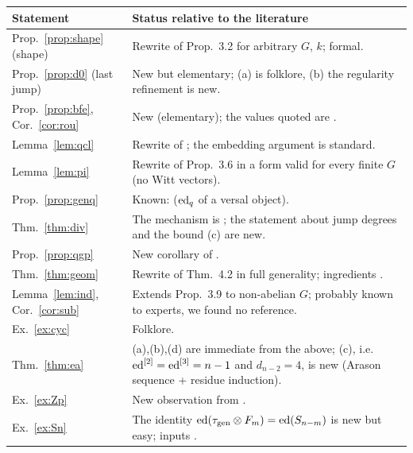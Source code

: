 \begin{center}
\small
\begin{tabular}{@{}p{}p{}@{}}
\toprule
Statement & Status relative to the literature\\
\midrule
Prop.~\ref{prop:shape} (shape) & Rewrite of Prop.~3.2 for arbitrary $G$, $k$; formal.\\
Prop.~\ref{prop:d0} (last jump) & New but elementary; (a) is folklore, (b) the
regularity refinement is new.\\
Prop.~\ref{prop:bfe}, Cor.~\ref{cor:rou} & New (elementary); the values quoted are
\cite{BR,KM}.\\
Lemma~\ref{lem:qcl} & Rewrite of \cite[(2.5)]{RS}; the embedding argument is standard.\\
Lemma~\ref{lem:pi} & Rewrite of Prop.~3.6 in a form valid for every finite $G$
(no Witt vectors).\\
Prop.~\ref{prop:genq} & Known: \cite{RS,Me} ($\operatorname{ed}_q$ of a versal object).\\
Thm.~\ref{thm:div} & The mechanism is \cite[Thm.~10.1]{RS}; the statement about jump
degrees and the bound (c) are new.\\
Prop.~\ref{prop:qgp} & New corollary of \cite{KM}.\\
Thm.~\ref{thm:geom} & Rewrite of Thm.~4.2 in full generality; ingredients
\cite{DR,RS}.\\
Lemma~\ref{lem:ind}, Cor.~\ref{cor:sub} & Extends Prop.~3.9 to non-abelian $G$;
probably known to experts, we found no reference.\\
Ex.~\ref{ex:cyc} & Folklore.\\
Thm.~\ref{thm:ea} & (a),(b),(d) are immediate from the above; (c), i.e.\
$\operatorname{ed}^{[2]}=\operatorname{ed}^{[3]}=n-1$ and $d_{n-2}=4$, is new (Arason sequence \cite{Ar} + residue
induction).\\
Ex.~\ref{ex:Zp} & New observation from \cite{Le07}.\\
Ex.~\ref{ex:Sn} & The identity $\operatorname{ed}(\tau_{\mathrm{gen}}\otimes F_m)=\operatorname{ed}(S_{n-m})$ is new but
easy; inputs \cite{BR,MR}.\\
\bottomrule
\end{tabular}
\end{center}

